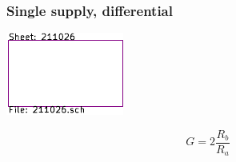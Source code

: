 \documentclass[]{article}
\begin{document}
\begin{multicols}{3}
\subsubsection{Single supply, differential}
\begin{center}
\includegraphics[width=0.7\columnwidth,page=5]{../KiCad/resume-crop.pdf}
\end{center}
$$G=2\frac{R_b}{R_a}$$


\end{multicols}
\end{document}
